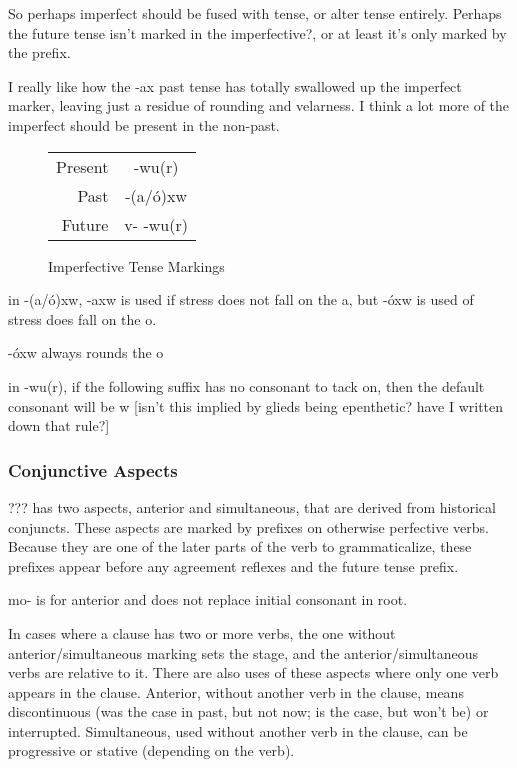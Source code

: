 \documentclass[12pt]{book} %
\begin{document}
{\color{orange}
So perhaps imperfect should be fused with tense, or alter tense entirely.
Perhaps the future tense isn't marked in the imperfective?, or at least it's only marked by the prefix.
}

{\color{red}I really like how the -ax past tense has totally swallowed up the imperfect marker, leaving just a residue of rounding and velarness.
I think a lot more of the imperfect should be present in the non-past.
}

\begin{figure}[H]
\centering
    \begin{tabular}{rc}
        Present & -wu(r)        \\
        Past        &  -(a/ó)xw \\
        Future  & v- -wu(r) \\
    \end{tabular}
\caption{Imperfective Tense Markings}\label{t:imperfective-tense}
\end{figure}

{\color{cyan}
in -(a/ó)xw, -axw is used if stress does not fall on the a, but -óxw is used of stress does fall on the o.

-óxw always rounds the o

in -wu(r), if the following suffix has no consonant to tack on, then the default consonant will be w {\color{red}[isn't this implied by glieds being epenthetic? have I written down that rule?]}
}

\subsubsection{Conjunctive Aspects}

??? has two aspects, anterior and simultaneous, that are derived from historical conjuncts.
These aspects are marked by prefixes on otherwise perfective verbs.
Because they are one of the later parts of the verb to grammaticalize, these prefixes appear before any agreement reflexes and the future tense prefix.

{\color{orange}
mo- is for anterior and does not replace initial consonant in root.
}

{\color{cyan}
In cases where a clause has two or more verbs, the one without anterior/simultaneous marking sets the stage, and the anterior/simultaneous verbs are relative to it.
There are also uses of these aspects where only one verb appears in the clause.
{\color{orange}
Anterior, without another verb in the clause, means discontinuous (was the case in past, but not now; is the case, but won't be) or interrupted.
Simultaneous, used without another verb in the clause, can be progressive or stative (depending on the verb).
}
}
\end{document}
